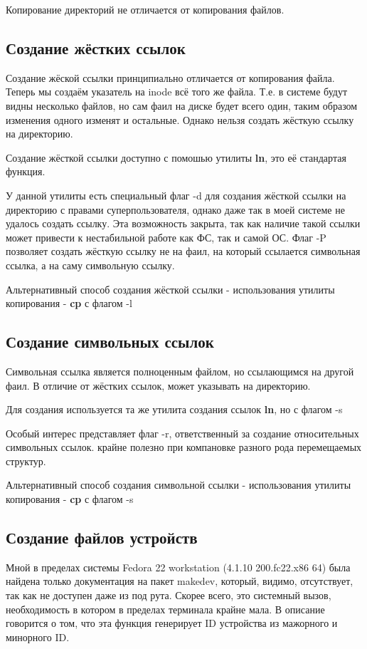\documentclass[a4paper]{article}
\begin{document}
Копирование директорий не отличается от копирования файлов.
\subsection{Создание жёстких ссылок}
\label{subsec:hl}
Создание жёской ссылки принципиально отличается от копирования файла. Теперь мы создаём указатель на inode всё того же файла. Т.е. в системе будут видны несколько файлов, но сам фаил на диске будет всего один, таким образом изменения одного изменят и остальные. Однако нельзя создать жёсткую ссылку на директорию.

Создание жёсткой ссылки доступно с помошью утилиты \textbf{ln}, это её стандартая функция.

У данной утилиты есть специальный флаг -d для создания жёсткой ссылки на директорию с правами суперпользователя, однако даже так в моей системе не удалось создать ссылку. Эта возможность закрыта, так как наличие такой ссылки может привести к нестабильной работе как ФС, так и самой ОС.
Флаг -P позволяет создать жёсткую  ссылку не на фаил, на который ссылается символьная ссылка, а на саму символьную ссылку.

Альтернативный способ создания жёсткой ссылки - использования утилиты копирования - \textbf{cp} с флагом -l

\subsection{Создание символьных ссылок}
\label{subsec:sl}
Символьная ссылка является полноценным файлом, но ссылающимся на другой фаил.
В отличие от жёстких ссылок, может указывать на директорию.

Для создания используется та же утилита создания ссылок \textbf{ln}, но с флагом -s


Особый интерес представляет флаг -r, ответственный за создание относительных символьных ссылок. крайне полезно при компановке разного рода перемещаемых структур.

Альтернативный способ создания символьной ссылки - использования утилиты копирования - \textbf{cp} с флагом -s
\subsection{Создание файлов устройств}
Мной в пределах системы Fedora 22 workstation (4.1.10 200.fc22.x86 64) была найдена только документация на пакет makedev, который, видимо, отсутствует, так как не доступен даже из под рута. Скорее всего, это системный вызов, необходимость в котором в пределах терминала крайне мала. В описание говорится о том, что эта функция генерирует ID устройства из мажорного и минорного ID.
\end{document}
